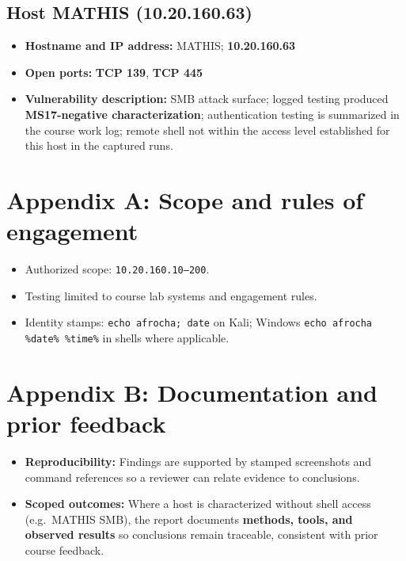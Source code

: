 \documentclass[11pt]{article}
\newcommand{\ScopeRange}{\texttt{10.20.160.10--200}}
\begin{document}
\subsection{Host MATHIS (10.20.160.63)}
\begin{itemize}
  \item \textbf{Hostname and IP address:} MATHIS; \textbf{10.20.160.63}
  \item \textbf{Open ports:} \textbf{TCP 139}, \textbf{TCP 445}
  \item \textbf{Vulnerability description:} SMB attack surface; logged testing produced \textbf{MS17-negative characterization}; authentication testing is summarized in the course work log; remote shell not within the access level established for this host in the captured runs.
\end{itemize}

\appendix
\section{Appendix A: Scope and rules of engagement}
\label{app:roe}

\begin{itemize}
  \item Authorized scope: \ScopeRange.
  \item Testing limited to course lab systems and engagement rules.
  \item Identity stamps: \texttt{echo afrocha; date} on Kali; Windows \texttt{echo afrocha \%date\% \%time\%} in shells where applicable.
\end{itemize}

\section{Appendix B: Documentation and prior feedback}
\label{app:doc-standards}

\begin{itemize}
  \item \textbf{Reproducibility:} Findings are supported by stamped screenshots and command references so a reviewer can relate evidence to conclusions.
  \item \textbf{Scoped outcomes:} Where a host is characterized without shell access (e.g.\ MATHIS SMB), the report documents \textbf{methods, tools, and observed results} so conclusions remain traceable, consistent with prior course feedback.
\end{itemize}
\end{document}

